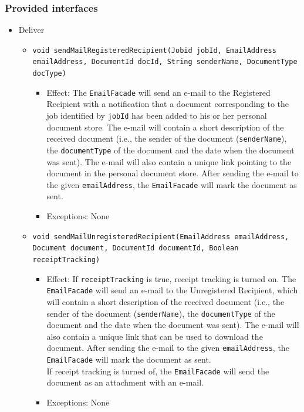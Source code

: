 \documentclass[a4paper,10pt]{article}
\begin{document}
\subsubsection*{Provided interfaces}
\begin{itemize}
    \item Deliver
    \begin{itemize}
    	\item \texttt{void sendMailRegisteredRecipient(Jobid jobId, EmailAddress emailAddress, DocumentId docId, String senderName, DocumentType docType)}    	
        \begin{itemize}
            \item Effect:  The \texttt{EmailFacade}  will send an e-mail to the Registered Recipient with a notification that a document corresponding to the job identified by \texttt{jobId} has been added to his or her personal document store. The e-mail will contain a short description of the received document (i.e., the sender of the document (\texttt{senderName}), the \texttt{documentType} of the document and the date when the document was sent). The e-mail will also contain a unique link pointing to the document in the personal document store. After sending the e-mail to the given \texttt{emailAddress}, the \texttt{EmailFacade} will mark the document as sent.
            \item Exceptions: None
		\end{itemize}
    
        \item \texttt{void sendMailUnregisteredRecipient(EmailAddress emailAddress,  Document document, DocumentId documentId, Boolean receiptTracking)}
        \begin{itemize}
            \item Effect: If \texttt{receiptTracking} is true, receipt tracking is turned on. The \texttt{EmailFacade} will send an e-mail to the Unregistered Recipient, which will contain a short description of the received document (i.e., the sender of the document (\texttt{senderName}), the \texttt{documentType} of the document and the date when the document was sent). The e-mail will also contain a unique link that can be used to download the document. After sending the e-mail to the given \texttt{emailAddress}, the \texttt{EmailFacade} will mark the document as sent.\\ If receipt tracking is turned of, the \texttt{EmailFacade} will send the document as an attachment with an e-mail.
            \item Exceptions: None
        \end{itemize}
    \end{itemize}


\end{itemize}
\end{document}
